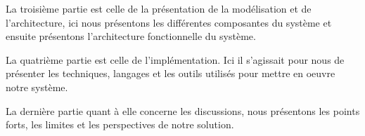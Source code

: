 La troisième partie est celle de la présentation de la modélisation et de l'architecture, ici nous présentons les différentes composantes du système et ensuite présentons l'architecture fonctionnelle du système.

La quatrième partie est celle de l'implémentation. Ici il s'agissait pour nous de présenter les techniques, langages et les outils utilisés pour mettre en oeuvre notre système. 

La dernière partie quant à elle concerne les discussions, nous présentons les points forts, les limites et les perspectives de notre solution.